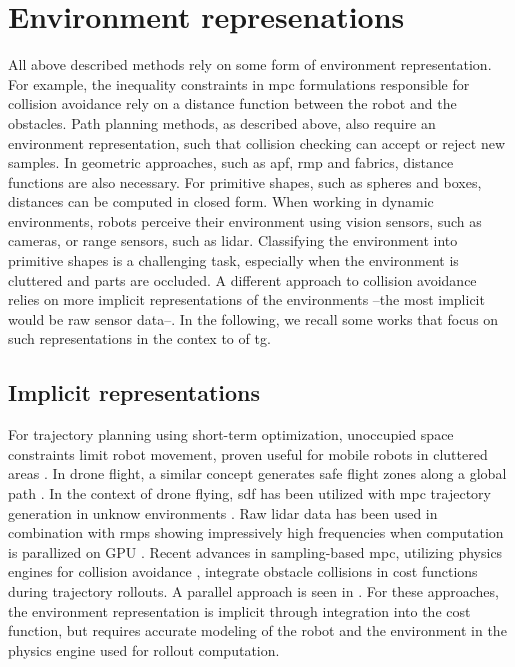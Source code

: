 \section{Environment represenations}
\label{sec:environment_representations}

All above described methods rely on some form of environment
representation. For example, the inequality constraints in
\ac{mpc} formulations responsible for collision avoidance
rely on a distance function between the robot and the
obstacles. Path planning methods, as described above, 
also require an environment representation, such that
collision checking can accept or reject new samples. In
geometric approaches, such as \ac{apf}, \ac{rmp} and
\ac{fabrics}, distance functions are also necessary.
For primitive shapes, such as spheres and boxes, distances
can be computed in closed form. When working in dynamic
environments, robots perceive their environment using vision
sensors, such as cameras, or range sensors, such as lidar.
Classifying the environment into primitive shapes is a
challenging task, especially when the environment is
cluttered and parts are occluded. A different approach to
collision avoidance relies on more implicit representations
of the environments --the most implicit would be raw sensor
data--. In the following, we recall some works that focus on
such representations in the contex to of \ac{tg}.


\subsection{Implicit representations}
\label{sub:implicit_representations}

For trajectory planning using short-term optimization,
unoccupied space constraints limit robot movement, proven
useful for mobile robots in cluttered areas
\cite{Brito2019}. In drone flight, a similar concept
generates safe flight zones along a global path
\cite{Liu2017a,Tordesillas2019a,tordesillas2021mader}. In
the context of drone flying, \ac{sdf} has been utilized with
\ac{mpc} trajectory generation in unknow environments
\cite{Oleynikova2017voxblox}. Raw lidar data has been used
in combination with \acp{rmp} showing impressively high
frequencies when computation is parallized on GPU
\cite{Pantic2023obstacle}. Recent advances in sampling-based
\ac{mpc}, utilizing physics engines for collision avoidance
\cite{Pezzato2023sampling}, integrate obstacle collisions in
cost functions during trajectory rollouts. A parallel
approach is seen in \cite{Sundaralingam2023curobo}. For
these approaches, the environment representation is implicit
through integration into the cost function, but requires
accurate modeling of the robot and the environment in the
physics engine used for rollout computation.


